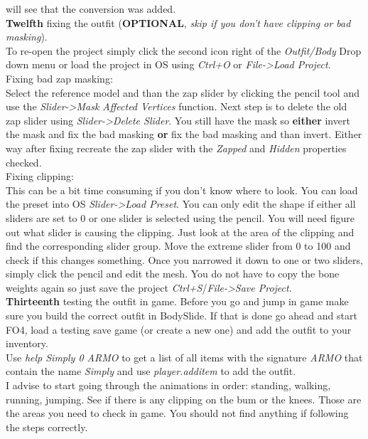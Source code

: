 will see that the conversion was added.\\
\textbf{Twelfth} fixing the outfit (\textbf{OPTIONAL}, \textit{skip if you don't have clipping or bad masking}).\\
To re-open the project simply click the second icon right of the \textit{Outfit/Body} Drop down menu or load the project in OS 
using \textit{Ctrl+O} or \textit{File->Load Project}.\\
Fixing bad zap masking:\\
Select the reference model and than the zap slider by clicking the pencil tool and use the 
\textit{Slider->Mask Affected Vertices} function. Next step is to delete the old zap slider using \textit{Slider->Delete Slider}.
You still have the mask so \textbf{either} invert the mask and fix the bad masking \textbf{or} fix the bad masking and than invert.
Either way after fixing recreate the zap slider with the \textit{Zapped} and \textit{Hidden} properties checked.\\
Fixing clipping:\\
This can be a bit time consuming if you don't know where to look. You can load the preset into OS \textit{Slider->Load Preset}.
You can only edit the shape if either all sliders are set to 0 or one slider is selected using the pencil. You will need figure out 
what slider is causing the clipping. Just look at the area of the clipping and find the corresponding slider group. Move the extreme 
slider from 0 to 100 and check if this changes something. Once you narrowed it down to one or two sliders, simply click the pencil and 
edit the mesh. You do not have to copy the bone weights again so just save the project \textit{Ctrl+S}/\textit{File->Save Project}.\\
\textbf{Thirteenth} testing the outfit in game. Before you go and jump in game make sure you build the correct outfit in BodySlide.
If that is done go ahead and start FO4, load a testing save game (or create a new one) and add the outfit to your inventory.\\
Use \textit{help Simply 0 ARMO} to get a list of all items with the signature \textit{ARMO} that contain the name \textit{Simply} and 
use \textit{player.additem} to add the outfit.\\
I advise to start going through the animations in order: standing, walking, running, jumping. See if there is any clipping on the bum 
or the knees. Those are the areas you need to check in game. You should not find anything if following the steps correctly.\\
